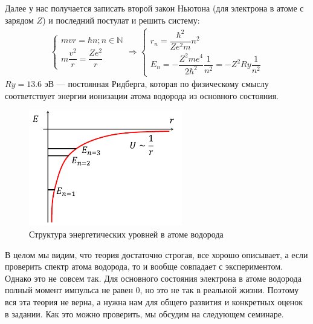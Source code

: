 \documentclass[12pt]{article}
\begin{document}
Далее у нас получается записать второй закон Ньютона (для электрона в атоме с зарядом $Z$) и последний постулат и решить систему:
\begin{gather*}
    \begin{cases}
     mvr = \hbar n; n\in \mathbb{N}\\[10pt]
     m\dfrac{v^2}{r} = \dfrac{Ze^2}{r}
     \end{cases}
     \Rightarrow
     \begin{cases}
     r_n = \dfrac{\hbar^2}{Ze^2m}n^2\\[10pt]
     E_n = -\dfrac{Z^2me^4}{2\hbar^2} \dfrac{1}{n^2} = -Z^2 Ry\dfrac{1}{n^2}
     \end{cases}
\end{gather*}
$Ry = 13.6$ эВ --- постоянная Ридберга, которая по физическому смыслу соответствует энергии ионизации атома водорода из основного состояния.

\begin{figure}[h]
    \centering
    \includegraphics[width=0.6\textwidth,height=\textheight,keepaspectratio]{Seminar_06/pics/pic_02.pdf}
    \caption{Структура энергетических уровней в атоме водорода}
    \label{fig:sem_04_H_energy_levels}
\end{figure}

В целом мы видим, что теория достаточно строгая, все хорошо описывает, а если проверить спектр атома водорода, то и вообще совпадает с экспериментом. Однако это не совсем так. Для основного состояния электрона в атоме водорода полный момент импульса не равен 0, но это не так в реальной жизни. Поэтому вся эта теория не верна, а нужна нам для общего развития и конкретных оценок в задании. Как это можно проверить, мы обсудим на следующем семинаре. 
\end{document}
